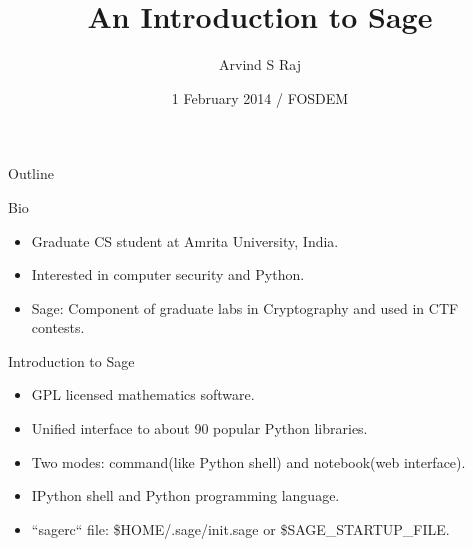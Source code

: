 \documentclass{beamer}
\title{An Introduction to Sage}
\author[Arvind]
{Arvind S Raj}
\institute[Amrita]
{
  Department of Cybersecurity Systems and Networks\\
  Amrita University, India
}
\date[FOSDEM 2014]
{1 February 2014 / FOSDEM}
\begin{document}
\begin{frame}
  \titlepage
\end{frame}

\begin{frame}{Outline}
  \tableofcontents
\end{frame}

\begin{frame}{Bio}
  \begin{itemize}
    \item Graduate CS student at Amrita University, India.
    \item Interested in computer security and Python.
    \item Sage: Component of graduate labs in Cryptography and used in CTF contests.
  \end{itemize}
\end{frame}

\begin{frame}{Introduction to Sage}
  \begin{itemize}
   \item GPL licensed mathematics software.
   \item Unified interface to about 90 popular Python libraries.
   \item Two modes: command(like Python shell) and notebook(web interface).
   \item IPython shell and Python programming language.
   \item ``sagerc`` file: \$HOME/.sage/init.sage or \$SAGE\_STARTUP\_FILE.
  \end{itemize}
\end{frame}
\end{document}
